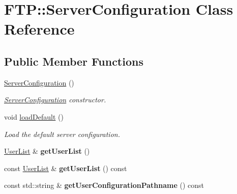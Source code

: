\hypertarget{class_f_t_p_1_1_server_configuration}{\section{F\-T\-P\-:\-:Server\-Configuration Class Reference}
\label{class_f_t_p_1_1_server_configuration}
}
\subsection*{Public Member Functions}
\begin{DoxyCompactItemize}
\item 
\hypertarget{class_f_t_p_1_1_server_configuration_a3bd14902cfa646699d2d782d95de673a}{\hyperlink{class_f_t_p_1_1_server_configuration_a3bd14902cfa646699d2d782d95de673a}{Server\-Configuration} ()}\label{class_f_t_p_1_1_server_configuration_a3bd14902cfa646699d2d782d95de673a}

\begin{DoxyCompactList}\small\item\em \hyperlink{class_f_t_p_1_1_server_configuration}{Server\-Configuration} constructor. \end{DoxyCompactList}\item 
\hypertarget{class_f_t_p_1_1_server_configuration_a11b98a6266117f6a3e18640dbd532c2b}{void \hyperlink{class_f_t_p_1_1_server_configuration_a11b98a6266117f6a3e18640dbd532c2b}{load\-Default} ()}\label{class_f_t_p_1_1_server_configuration_a11b98a6266117f6a3e18640dbd532c2b}

\begin{DoxyCompactList}\small\item\em Load the default server configuration. \end{DoxyCompactList}\item 
\hypertarget{class_f_t_p_1_1_server_configuration_aef31c0113abb25ab40875212fda7172e}{\hyperlink{class_f_t_p_1_1_user_list}{User\-List} \& {\bfseries get\-User\-List} ()}\label{class_f_t_p_1_1_server_configuration_aef31c0113abb25ab40875212fda7172e}

\item 
\hypertarget{class_f_t_p_1_1_server_configuration_a08aced6da32db6cdc904f5a8292869d7}{const \hyperlink{class_f_t_p_1_1_user_list}{User\-List} \& {\bfseries get\-User\-List} () const }\label{class_f_t_p_1_1_server_configuration_a08aced6da32db6cdc904f5a8292869d7}

\item 
\hypertarget{class_f_t_p_1_1_server_configuration_ac1247c63b4e2501931137f3d2093a94f}{const std\-::string \& {\bfseries get\-User\-Configuration\-Pathname} () const }\label{class_f_t_p_1_1_server_configuration_ac1247c63b4e2501931137f3d2093a94f}


\end{DoxyCompactItemize}
